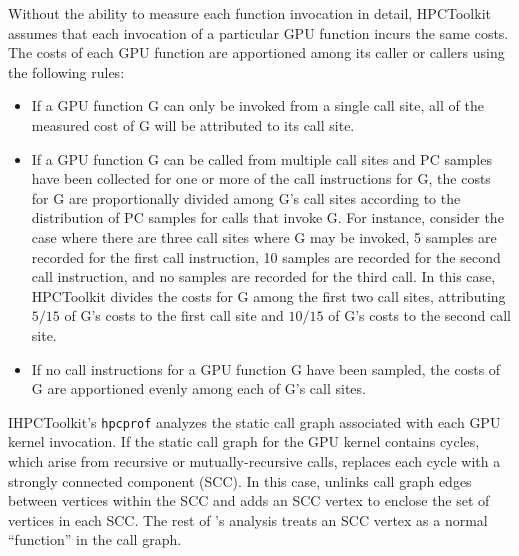Without the ability to measure each function invocation in detail, HPCToolkit assumes that each invocation of a particular GPU function incurs the same costs. The costs of each GPU function are apportioned among its caller or callers using the following rules:

\begin{itemize}
\item
If a GPU function G can only be invoked from a single call site, all of the measured cost of G will be attributed to its call site. 
\item
If a GPU function G can be called from multiple call sites and PC samples have been collected for one or more of the call instructions for G, the costs for G are proportionally divided among G's call sites according to the distribution of PC samples for calls that invoke G.  For instance, consider the case where there are three call sites where G may be invoked, 5 samples are recorded for the first call instruction, 10 samples are recorded for the second call instruction, and no samples are recorded for the third call. In this case, HPCToolkit divides the costs for G  among the first two call sites, attributing $5/15$ of G's costs  to the first call site and $10/15$ of G's costs to the second call site. 
\item
If no call instructions for a GPU function G have been sampled, the costs of G are apportioned evenly among each of G's call sites.
\end{itemize}

IHPCToolkit's {\tt hpcprof} analyzes the static call graph associated with each GPU kernel invocation. If the static call graph for the GPU kernel contains cycles, which arise from recursive or mutually-recursive calls,  \hpcprof{} replaces each cycle with a strongly connected component (SCC). In this case, \hpcprof{} unlinks call graph edges between vertices within the SCC and adds an SCC vertex to enclose the set of vertices in each SCC. The rest of \hpcprof{}'s analysis 
treats an SCC vertex as a normal ``function'' in the call graph.

